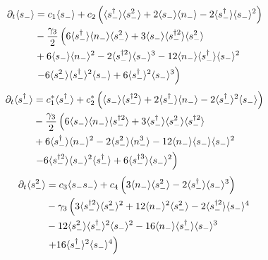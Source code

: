 \begin{align}\label{eqn:expectations_linear_first}
%
%
\partial_t\langle s_- \rangle &= c_1 \langle s_- \rangle + c_2 \left(\langle s_-^\dagger \rangle \langle s_-^2 \rangle + 2 \langle s_- \rangle \langle n_-\rangle - 2 \langle s_-^\dagger \rangle \langle s_- \rangle^2\right) \notag \\
%
&-\frac{\gamma_3}{2}\left(
6 \langle s_-^\dagger \rangle \langle n_- \rangle \langle s_-^2\rangle + 3 \langle s_- \rangle \langle s_-^{\dagger 2} \rangle \langle s_-^2 \rangle \right. \notag \\
%
&+ 6 \langle s_- \rangle \langle n_- \rangle^2 - 2 \langle s_-^{\dagger 2} \rangle \langle s_- \rangle^3 - 12 \langle n_- \rangle \langle s_-^\dagger \rangle \langle s_- \rangle^2 \notag \\
%
&\left. - 6 \langle s_-^2 \rangle \langle s_-^\dagger \rangle^2 \langle s_- \rangle + 6 \langle s_-^\dagger \rangle^2 \langle s_- \rangle^3\right)
\end{align}
\begin{align}
%
%
\partial_t\langle s_-^\dagger \rangle &= c_1^* \langle s_-^\dagger \rangle + c_2^* \left(\langle s_- \rangle \langle s_-^{\dagger 2} \rangle + 2 \langle s_-^\dagger \rangle \langle n_- \rangle - 2 \langle s_-^\dagger \rangle^2\langle s_- \rangle \right) \notag \\
%
&-\frac{\gamma_3}{2}\left(6 \langle s_- \rangle \langle n_- \rangle \langle s_-^{\dagger 2}\rangle + 3 \langle s_-^\dagger \rangle \langle s_-^2 \rangle \langle s_-^{\dagger 2}\rangle \notag \right. \notag \\
%
&+ 6 \langle s_-^\dagger \rangle \langle n_-\rangle^2 - 2 \langle s_-^2 \rangle \langle n_-^3\rangle - 12 \langle n_- \rangle \langle s_- \rangle \langle s_- \rangle^2 \notag \\
%
&\left. - 6 \langle s_-^{\dagger 2} \rangle \langle s_- \rangle^2 \langle s_-^\dagger \rangle + 6 \langle s_-^{\dagger 3} \rangle \langle s_- \rangle^2 \right)
\end{align}
\begin{align}
%
%
\partial_t\langle s_-^2 \rangle &= c_3 \langle s_- s_- \rangle + c_4 \left( 3 \langle n_- \rangle \langle s_-^2 \rangle  - 2 \langle s_-^\dagger \rangle \langle s_- \rangle^3 \right) \notag \\
%
&- \gamma_3 \left( 3 \langle s_-^{\dagger 2}\rangle \langle s_-^2\rangle^2 + 12 \langle n_- \rangle^2 \langle s_-^2\rangle - 2 \langle s_-^{\dagger 2}\rangle \langle s_- \rangle^4 \right. \notag \\
%
& - 12 \langle s_-^2 \rangle \langle s_-^{\dagger}\rangle^2 \langle s_- \rangle^2 - 16 \langle n_- \rangle \langle s_-^\dagger \rangle \langle s_- \rangle^3 \notag \\
%
&\left. + 16 \langle s_-^\dagger \rangle^2 \langle s_- \rangle^4 \right)
\end{align}
